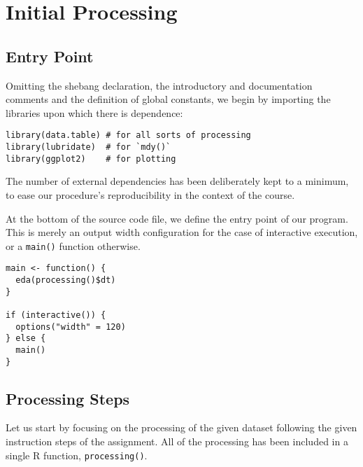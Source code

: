 \section{Initial Processing}


\subsection{Entry Point}

Omitting the shebang declaration, the introductory and documentation comments and the definition of global constants, we begin by importing the libraries upon which there is dependence:

\begin{verbatim}
library(data.table) # for all sorts of processing
library(lubridate)  # for `mdy()`
library(ggplot2)    # for plotting
\end{verbatim}

The number of external dependencies has been deliberately kept to a minimum, to ease our procedure's reproducibility in the context of the course.

At the bottom of the source code file, we define the entry point of our program.
This is merely an output width configuration for the case of interactive execution, or a \texttt{main()} function otherwise.

\begin{verbatim}
main <- function() {
  eda(processing()$dt)
}

if (interactive()) {
  options("width" = 120)
} else {
  main()
}
\end{verbatim}


\subsection{Processing Steps}

Let us start by focusing on the processing of the given dataset following the given instruction steps of the assignment.
All of the processing has been included in a single R function, \texttt{processing()}.

